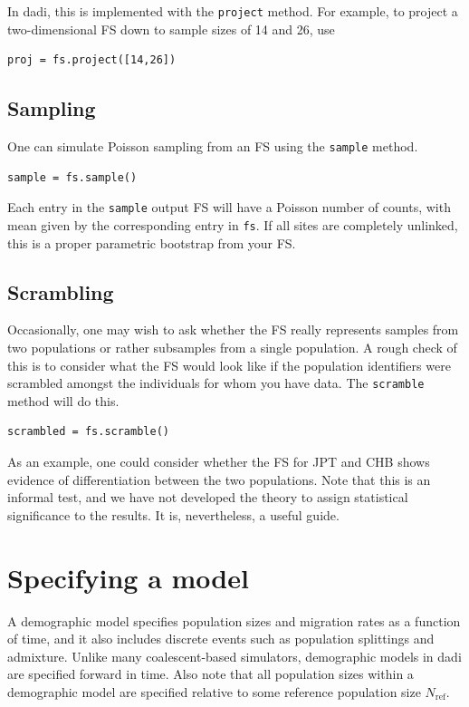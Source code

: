 \documentclass[12pt]{article}
\makeatletter
\newcommand{\dadi}{dadi\xspace}
\newcommand{\Nref}{\ensuremath{N_\text{ref}}\xspace}
\newcommand{\py}[1]{\lstinline[language=Python, showstringspaces=False]@#1@}
\makeatother
\begin{document}
In \dadi, this is implemented with the \py{project} method.
For example, to project a two-dimensional FS down to sample sizes of 14 and 26, use
\begin{lstlisting}
proj = fs.project([14,26])
\end{lstlisting}

\subsection{Sampling}

One can simulate Poisson sampling from an FS using the \py{sample} method.
\begin{lstlisting}
sample = fs.sample()
\end{lstlisting}
Each entry in the \py{sample} output FS will have a Poisson number of counts, with mean given by the corresponding entry in \py{fs}.
If all sites are completely unlinked, this is a proper parametric bootstrap from your FS.

\subsection{Scrambling}

Occasionally, one may wish to ask whether the FS really represents samples from two populations or rather subsamples from a single population.
A rough check of this is to consider what the FS would look like if the population identifiers were scrambled amongst the individuals for whom you have data.
The \py{scramble} method will do this.
\begin{lstlisting}
scrambled = fs.scramble()
\end{lstlisting}
As an example, one could consider whether the FS for JPT and CHB shows evidence of differentiation between the two populations.
Note that this is an informal test, and we have not developed the theory to assign statistical significance to the results.
It is, nevertheless, a useful guide.

\section{Specifying a model}

A demographic model specifies population sizes and migration rates as a function of time, and it also includes discrete events such as population splittings and admixture.
Unlike many coalescent-based simulators, demographic models in \dadi are specified forward in time.
Also note that all population sizes within a demographic model are specified relative to some reference population size \Nref.
\end{document}
